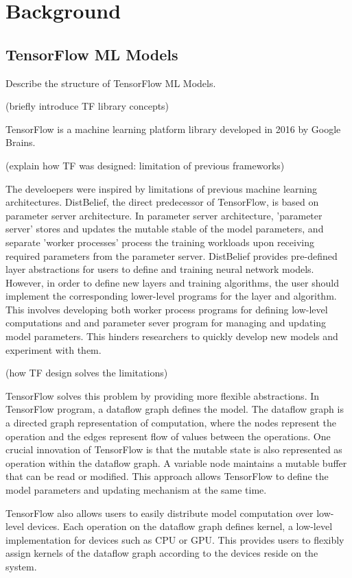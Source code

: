 \section{Background}\label{sec:background}
\subsection{TensorFlow ML Models}
Describe the structure of TensorFlow ML Models.

(briefly introduce TF library concepts)

TensorFlow\cite{tensorflow} is a machine learning platform library
developed in 2016 by Google Brains.

(explain how TF was designed: limitation of previous frameworks)

The develoepers were inspired by
limitations of previous machine learning architectures.
DistBelief, the direct predecessor of TensorFlow,
is based on parameter server architecture.
In parameter server architecture,
'parameter server' stores and updates the mutable stable of
the model parameters, and separate 'worker processes'
process the training workloads upon receiving required parameters
from the parameter server.
DistBelief provides pre-defined layer abstractions
for users to define and training neural network models.
However, in order to define new layers and training algorithms,
the user should implement the corresponding lower-level programs
for the layer and algorithm.
This involves developing both worker process programs
for defining low-level computations and
and parameter sever program for managing and updating model parameters.
This hinders researchers to quickly develop new models
and experiment with them.

(how TF design solves the limitations)

TensorFlow solves this problem by providing more flexible abstractions.
In TensorFlow program, a dataflow graph defines the model.
The dataflow graph is a directed graph representation of computation,
where the nodes represent the operation and
the edges represent flow of values between the operations.
One crucial innovation of TensorFlow is that the mutable state
is also represented as operation within the dataflow graph.
A variable node maintains a mutable buffer that can be read or modified.
This approach allows TensorFlow to define the model parameters
and updating mechanism at the same time.

TensorFlow also allows users to easily distribute model computation
over low-level devices.
Each operation on the dataflow graph defines kernel,
a low-level implementation for devices such as CPU or GPU.
This provides users to flexibly assign kernels of the dataflow graph
according to the devices reside on the system.

